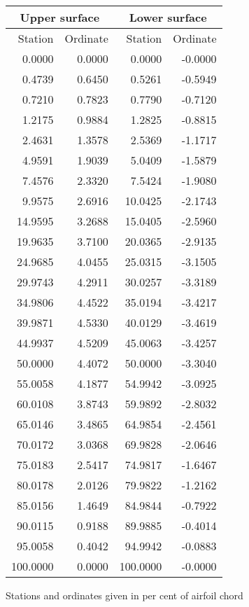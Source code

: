 \documentclass[11pt]{book}
\begin{document}
 \hspace{4mm}
 \begin{tabular}{|r|r|r|r|} \hline 
 \multicolumn{2}{|c|}{Upper surface} & \multicolumn{2}{|c|}{Lower surface} \\
 \hline
 Station & Ordinate & Station & Ordinate \\
 \hline
0.0000 & 0.0000 & 0.0000 & -0.0000 \\
0.4739 & 0.6450 & 0.5261 & -0.5949 \\
0.7210 & 0.7823 & 0.7790 & -0.7120 \\
1.2175 & 0.9884 & 1.2825 & -0.8815 \\
2.4631 & 1.3578 & 2.5369 & -1.1717 \\
4.9591 & 1.9039 & 5.0409 & -1.5879 \\
7.4576 & 2.3320 & 7.5424 & -1.9080 \\
9.9575 & 2.6916 & 10.0425 & -2.1743 \\
14.9595 & 3.2688 & 15.0405 & -2.5960 \\
19.9635 & 3.7100 & 20.0365 & -2.9135 \\
24.9685 & 4.0455 & 25.0315 & -3.1505 \\
29.9743 & 4.2911 & 30.0257 & -3.3189 \\
34.9806 & 4.4522 & 35.0194 & -3.4217 \\
39.9871 & 4.5330 & 40.0129 & -3.4619 \\
44.9937 & 4.5209 & 45.0063 & -3.4257 \\
50.0000 & 4.4072 & 50.0000 & -3.3040 \\
55.0058 & 4.1877 & 54.9942 & -3.0925 \\
60.0108 & 3.8743 & 59.9892 & -2.8032 \\
65.0146 & 3.4865 & 64.9854 & -2.4561 \\
70.0172 & 3.0368 & 69.9828 & -2.0646 \\
75.0183 & 2.5417 & 74.9817 & -1.6467 \\
80.0178 & 2.0126 & 79.9822 & -1.2162 \\
85.0156 & 1.4649 & 84.9844 & -0.7922 \\
90.0115 & 0.9188 & 89.9885 & -0.4014 \\
95.0058 & 0.4042 & 94.9942 & -0.0883 \\
100.0000 & 0.0000 & 100.0000 & -0.0000 \\
 \hline 
 \end{tabular}
 \vspace{8mm}

Stations and ordinates given in per cent of airfoil chord
\end{document}
